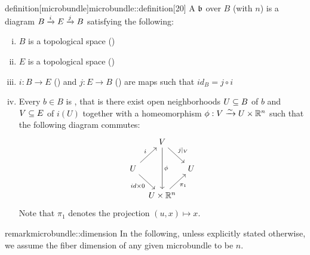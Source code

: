 \begin{mystatement}{definition}[microbundle]{microbundle::definition}[20]
    A  $\bb$ over $B$ (with  $n$)
    is a diagram $\bundle{B}{E}{i}{j}$ satisfying the following:
    \begin{enumerate}[(i)]
        \item $B$ is a topological space ()
        \item $E$ is a topological space ()
        \item $i: B \to E$ () and $j: E \to B$ ()
        are maps such that $id_B = j \circ i$
        \item Every $b \in B$ is ,
        that is there exist open neighborhoods $U \sub B$ of $b$ and $V \sub E$ of $i(U)$
        together with a homeomorphism $\phi: V \isomto U \cross \R^n$ such that the following diagram commutes:
        \[
            \begin{tikzcd}[column sep=tiny]
                & V \ar[dr, "j\vert_V"] \ar[dd, "\phi"] & \\
                U \ar[ur, "i"] \ar[dr, "{id \cross 0}"'] & & U \\
                & U \cross\R^n \ar[ur, "\pi_1"'] &
            \end{tikzcd}
        \]
        Note that $\pi_1$ denotes the projection $(u, x) \mapsto x$.
    \end{enumerate}
\end{mystatement}

\begin{mystatement}{remark}{microbundle::dimension}
    In the following, unless explicitly stated otherwise,
    we assume the fiber dimension of any given microbundle to be $n$.
\end{mystatement}